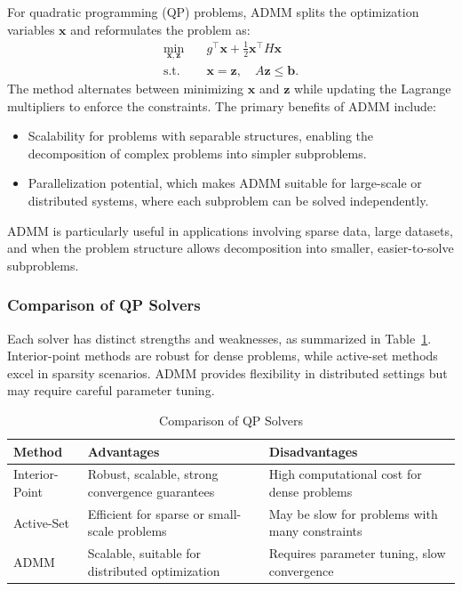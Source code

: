 \documentclass{article}
\begin{document}
For quadratic programming (QP) problems, ADMM splits the optimization variables $\mathbf{x}$ and reformulates the problem as:
\begin{align*}
\min_{\mathbf{x}, \mathbf{z}} &\quad g^\top \mathbf{x} + \frac{1}{2} \mathbf{x}^\top H \mathbf{x} \\
\text{s.t.} &\quad \mathbf{x} = \mathbf{z}, \quad A \mathbf{z} \leq \mathbf{b}.
\end{align*}
The method alternates between minimizing $\mathbf{x}$ and $\mathbf{z}$ while updating the Lagrange multipliers to enforce the constraints. The primary benefits of ADMM include:
\begin{itemize}
    \item Scalability for problems with separable structures, enabling the decomposition of complex problems into simpler subproblems.
    \item Parallelization potential, which makes ADMM suitable for large-scale or distributed systems, where each subproblem can be solved independently.
\end{itemize}
ADMM is particularly useful in applications involving sparse data, large datasets, and when the problem structure allows decomposition into smaller, easier-to-solve subproblems.


\subsubsection{Comparison of QP Solvers}
Each solver has distinct strengths and weaknesses, as summarized in Table~\ref{tab:qp-solver-comparison}. Interior-point methods are robust for dense problems, while active-set methods excel in sparsity scenarios. ADMM provides flexibility in distributed settings but may require careful parameter tuning.


\begin{table}[h]
\centering
\caption{Comparison of QP Solvers}
\label{tab:qp-solver-comparison}
\begin{adjustbox}{max width=\textwidth}
\begin{tabular}{|l|l|l|}
\hline
\textbf{Method}            & \textbf{Advantages}                                  & \textbf{Disadvantages} \\ \hline
Interior-Point             & Robust, scalable, strong convergence guarantees      & High computational cost for dense problems \\ \hline
Active-Set                 & Efficient for sparse or small-scale problems          & May be slow for problems with many constraints \\ \hline
ADMM                       & Scalable, suitable for distributed optimization       & Requires parameter tuning, slow convergence \\ \hline
\end{tabular}
\end{adjustbox}
\end{table}
\end{document}
